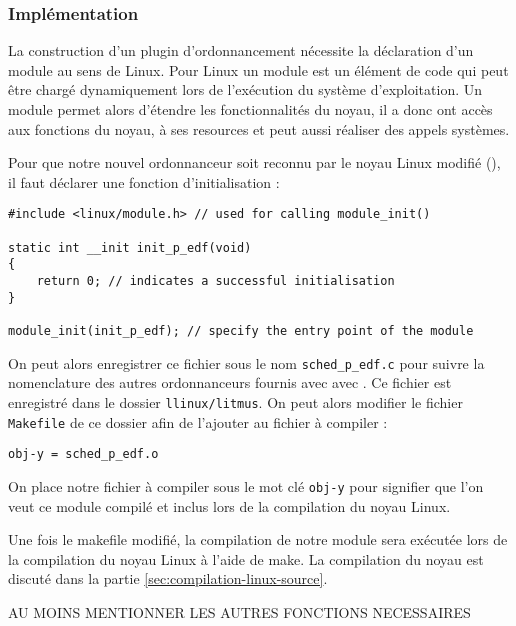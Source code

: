 \subsubsection{Implémentation}

La construction d'un plugin d'ordonnancement nécessite la déclaration d'un module au sens de Linux. Pour Linux un module est un élément de code qui peut être chargé dynamiquement lors de l’exécution du système d'exploitation. Un module permet alors d'étendre les fonctionnalités du noyau, il a donc ont accès aux fonctions du noyau, à ses resources et peut aussi réaliser des appels systèmes.

Pour que notre nouvel ordonnanceur soit reconnu par le noyau Linux modifié (\litmus), il faut déclarer une fonction d'initialisation :
\begin{lstlisting}[style=cstyle]
#include <linux/module.h> // used for calling module_init()

static int __init init_p_edf(void)
{
    return 0; // indicates a successful initialisation
}

module_init(init_p_edf); // specify the entry point of the module 
\end{lstlisting} 

On peut alors enregistrer ce fichier sous le nom \lstinline{sched_p_edf.c} pour suivre la nomenclature des autres ordonnanceurs fournis avec avec \litmus. Ce fichier est enregistré dans le dossier \lstinline{llinux/litmus}. On peut alors modifier le fichier \lstinline{Makefile} de ce dossier afin de l'ajouter au fichier à compiler :

\begin{lstlisting}[style=makefilestyle]  
    obj-y = sched_p_edf.o
\end{lstlisting}    

On place notre fichier à compiler sous le mot clé \texttt{obj-y} pour signifier que l'on veut ce module compilé et inclus lors de la compilation du noyau Linux.

Une fois le makefile modifié, la compilation de notre module sera exécutée lors de la compilation du noyau Linux à l'aide de make. La compilation du noyau est discuté dans la partie \ref{sec:compilation-linux-source}.

\begin{center}
    \color{red}
    AU MOINS MENTIONNER LES AUTRES FONCTIONS NECESSAIRES
\end{center}

    